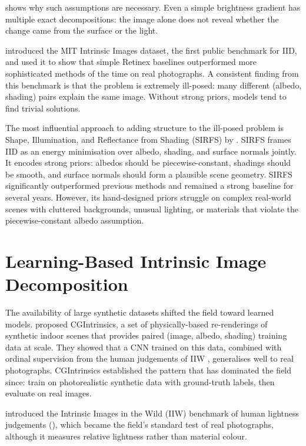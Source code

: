  shows why such assumptions are necessary. Even a
simple brightness gradient has multiple exact decompositions: the image alone
does not reveal whether the change came from the surface or the light.


 introduced the MIT Intrinsic Images dataset,
the first public benchmark for IID, and used it to show that simple Retinex
baselines outperformed more sophisticated methods of the time on real photographs.
A consistent finding from this benchmark is that the problem is extremely
ill-posed: many different (albedo, shading) pairs explain the same image.
Without strong priors, models tend to find trivial solutions.

The most influential approach to adding structure to the ill-posed problem is
Shape, Illumination, and Reflectance from Shading (SIRFS) by
.
SIRFS frames IID as an energy minimisation over albedo, shading, and surface
normals jointly.
It encodes strong priors: albedos should be piecewise-constant, shadings should be
smooth, and surface normals should form a plausible scene geometry.
SIRFS significantly outperformed previous methods and remained a strong baseline
for several years.
However, its hand-designed priors struggle on complex real-world scenes with
cluttered backgrounds, unusual lighting, or materials that violate the
piecewise-constant albedo assumption.


\section{Learning-Based Intrinsic Image Decomposition}
\label{sec:learning_iid}

The availability of large synthetic datasets shifted the field toward learned models.
 proposed CGIntrinsics, a set of physically-based
re-renderings of synthetic indoor scenes that provides paired
(image, albedo, shading) training data at scale.
They showed that a CNN trained on this data, combined with ordinal supervision
from the human judgements of IIW , generalises well to real
photographs.
CGIntrinsics established the pattern that has dominated the field since:
train on photorealistic synthetic data with ground-truth labels, then evaluate
on real images.

 introduced the Intrinsic Images in the Wild (IIW) benchmark of human
lightness judgements (), which became the field's standard test of
real photographs, although it measures relative lightness rather than material colour.

